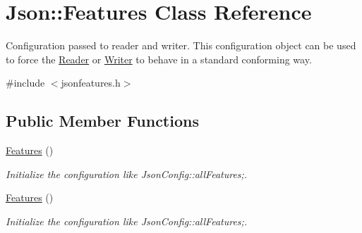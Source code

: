 \hypertarget{classJson_1_1Features}{\section{Json\-:\-:Features Class Reference}
\label{d0/d7e/classJson_1_1Features}
}


Configuration passed to reader and writer. This configuration object can be used to force the \hyperlink{classJson_1_1Reader}{Reader} or \hyperlink{classJson_1_1Writer}{Writer} to behave in a standard conforming way.  




{\ttfamily \#include $<$jsonfeatures.\-h$>$}

\subsection*{Public Member Functions}
\begin{DoxyCompactItemize}
\item 
\hyperlink{classJson_1_1Features_ad15a091cb61bb31323299a95970d2644}{Features} ()
\begin{DoxyCompactList}\small\item\em Initialize the configuration like Json\-Config\-::all\-Features;. \end{DoxyCompactList}\item 
\hyperlink{classJson_1_1Features_ad15a091cb61bb31323299a95970d2644}{Features} ()
\begin{DoxyCompactList}\small\item\em Initialize the configuration like Json\-Config\-::all\-Features;. \end{DoxyCompactList}\end{DoxyCompactItemize}
